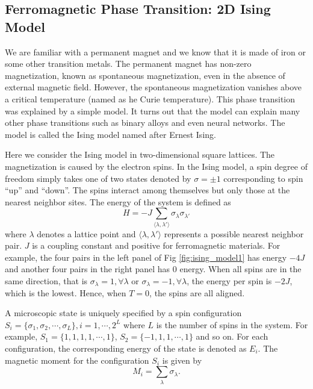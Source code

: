 \subsection{Ferromagnetic Phase Transition:  2D Ising Model}



We are familiar with a permanent magnet and we know that it is made of iron or some other transition metals. The permanent magnet has non-zero  magnetization, known as spontaneous magnetization,  even in the absence of external magnetic field. However, the spontaneous magnetization vanishes above a critical temperature (named as he Curie temperature).  This phase transition was explained by a simple model.  It turns out that the model can explain many other phase transitions such as binary alloys and even neural networks.  The model is called the Ising model named after Ernest Ising.

Here we consider the Ising model in two-dimensional square lattices.  The magnetization is caused by the electron spins. In the Ising model, a spin degree of freedom simply takes one of two states denoted by $\sigma=\pm 1$ corresponding to spin ``up'' and ``down''.  The spins interact among themselves but only those at the nearest neighbor sites.  The energy of  the system is defined as
\begin{equation}\label{eq:ising_H}
H = - J \sum_{\langle \lambda, \lambda' \rangle} \sigma_\lambda \sigma_{\lambda'}
\end{equation}
where $\lambda$ denotes a lattice point and $\langle \lambda, \lambda' \rangle$ represents a possible nearest neighbor pair.
$J$ is a coupling constant and positive for ferromagnetic materials.  For example, the four pairs in the left panel of Fig \ref{fig:ising_model1} has energy $-4J$ and another four pairs in the right panel has $0$ energy.  When all spins are in the same direction,
that is $\sigma_\lambda=1, \forall \lambda$ or $\sigma_\lambda=-1, \forall \lambda$, the energy per spin is $-2J$, which is the lowest.
Hence, when $T=0$, the spins are all aligned.

A microscopic state is uniquely specified by a spin configuration $S_i=\{ \sigma_1, \sigma_2, \cdots, \sigma_L \}, i=1, \cdots, 2^L$ where $L$ is the number of spins in the system.  For example, $S_1=\{1,1,1,1, \cdots, 1\}$, $S_2=\{-1, 1, 1, \cdots, 1\}$ and so on.   For each configuration, the corresponding energy of the state is denoted as $E_i$.  The magnetic moment for the configuration $S_i$ is given by
\begin{equation}
M_i = \sum_\lambda \sigma_\lambda.
\end{equation}

